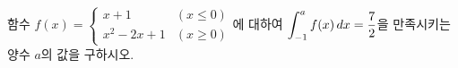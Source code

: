 함수 $f(x)=\begin{cases} x+1 & (x\le 0) \\ x^2-2x+1 & (x\ge 0) \end{cases}$에 대하여 $\displaystyle\int_{-1}^{a}f(x)\mkern3mu dx=\dfrac{7}{2}$을 만족시키는 양수 $a$의 값을 구하시오.
